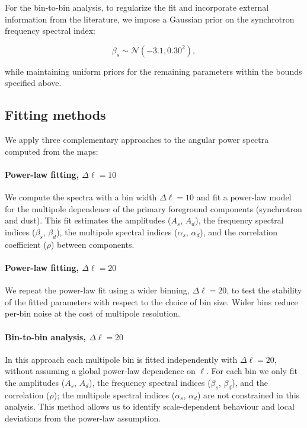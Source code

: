 For the bin-to-bin analysis, to regularize the fit and incorporate external information from the literature, we impose a Gaussian prior on the synchrotron frequency spectral index:

\begin{equation}
\beta_s \sim \mathcal{N}(-3.1, 0.30^2),
\end{equation}

while maintaining uniform priors for the remaining parameters within the bounds specified above.

\subsection{Fitting methods}
\label{sec:fitting_methods}

We apply three complementary approaches to the angular power spectra computed from the maps:

\paragraph{Power-law fitting, $\Delta\ell = 10$}
We compute the spectra with a bin width $\Delta\ell = 10$ and fit a power-law model for the multipole dependence of the primary foreground components (synchrotron and dust). This fit estimates the amplitudes ($A_s$, $A_d$), the frequency spectral indices ($\beta_s$, $\beta_d$), the multipole spectral indices ($\alpha_s$, $\alpha_d$), and the correlation coefficient ($\rho$) between components.

\paragraph{Power-law fitting, $\Delta\ell = 20$}
We repeat the power-law fit using a wider binning, $\Delta\ell = 20$, to test the stability of the fitted parameters with respect to the choice of bin size. Wider bins reduce per-bin noise at the cost of multipole resolution.

\paragraph{Bin-to-bin analysis, $\Delta\ell = 20$}
In this approach each multipole bin is fitted independently with $\Delta\ell = 20$, without assuming a global power-law dependence on $\ell$. For each bin we only fit the amplitudes ($A_s$, $A_d$), the frequency spectral indices ($\beta_s$, $\beta_d$), and the correlation ($\rho$); the multipole spectral indices ($\alpha_s$, $\alpha_d$) are not constrained in this analysis. This method allows us to identify scale-dependent behaviour and local deviations from the power-law assumption.
